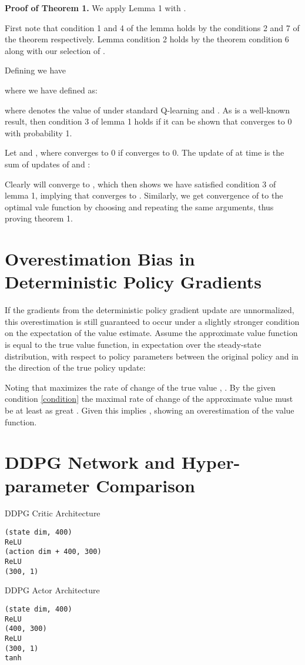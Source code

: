 \documentclass{article}
\begin{document}
\textbf{Proof of Theorem 1.} We apply Lemma 1 with .  

First note that condition 1 and 4 of the lemma holds by the conditions 2 and 7 of the theorem respectively. Lemma condition 2 holds by the theorem condition 6 along with our selection of .  

Defining  we have

where we have defined  as:

where  denotes the value of  under standard Q-learning and .
As  is a well-known result, then condition 3 of lemma 1 holds if it can be shown that  converges to 0 with probability 1. 

Let  and , where  converges to 0 if  converges to 0.
The update of  at time  is the sum of updates of  and :

Clearly  will converge to , which then shows we have satisfied condition 3 of lemma 1, implying that  converges to . Similarly, we get convergence of  to the optimal vale function by choosing  and repeating the same arguments, thus proving theorem 1. 

\section{Overestimation Bias in Deterministic Policy Gradients} \label{sec:sm_over}


If the gradients from the deterministic policy gradient update are unnormalized, this overestimation is still guaranteed to occur under a slightly stronger condition on the expectation of the value estimate. Assume the approximate value function is equal to the true value function, in expectation over the steady-state distribution, with respect to policy parameters between the original policy and in the direction of the true policy update:

Noting that  maximizes the rate of change of the true value , . By the given condition \ref{condition} the maximal rate of change of the approximate value must be at least as great . Given  this implies , showing an overestimation of the value function.


\clearpage
\section{DDPG Network and Hyper-parameter Comparison}
\label{sec:sm_hyp}


DDPG Critic Architecture
\begin{verbatim}
(state dim, 400)
ReLU
(action dim + 400, 300)
ReLU
(300, 1)
\end{verbatim}
DDPG Actor Architecture
\begin{verbatim}
(state dim, 400)
ReLU
(400, 300)
ReLU
(300, 1)
tanh
\end{verbatim}
\end{document}
